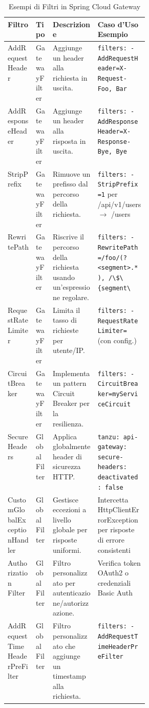 \begin{table}[ht!]
\small
\centering
\caption{Esempi di Filtri in Spring Cloud Gateway}
\renewcommand{\arraystretch}{1.5}
\label{tab:filtri_scg_}
\begin{tabularx}{\linewidth}{%
    >{\RaggedRight\arraybackslash}p{0.2\linewidth} 
    >{\RaggedRight\arraybackslash}p{0.12\linewidth} 
    >{\RaggedRight\arraybackslash}X                 
    >{\RaggedRight\arraybackslash}X                 
}
\toprule
\textbf{Filtro} & \textbf{Tipo} & \textbf{Descrizione} & \textbf{Caso d'Uso Esempio} \\
\midrule
AddRequestHeader & GatewayFilter & Aggiunge un header alla richiesta in uscita. & \lstinline{filters: - AddRequestHeader=X-Request-Foo, Bar} \\
AddResponseHeader & GatewayFilter & Aggiunge un header alla risposta in uscita. & \lstinline{filters: - AddResponseHeader=X-Response-Bye, Bye} \\
StripPrefix & GatewayFilter & Rimuove un prefisso dal percorso della richiesta. & \lstinline{filters: - StripPrefix=1} per /api/v1/users $\rightarrow$ /users \\
RewritePath & GatewayFilter & Riscrive il percorso della richiesta usando un'espressione regolare. & \lstinline{filters: - RewritePath=/foo/(?<segment>.*), /\$\{segment\}} \\
RequestRateLimiter & GatewayFilter & Limita il tasso di richieste per utente/IP. & \lstinline{filters: - RequestRateLimiter=} (con config.) \\
CircuitBreaker & GatewayFilter & Implementa un pattern Circuit Breaker per la resilienza. & \lstinline{filters: - CircuitBreaker=myServiceCircuit} \\
SecureHeaders & GlobalFilter & Applica globalmente header di sicurezza HTTP. & \lstinline{tanzu: api-gateway: secure-headers: deactivated: false} \\
CustomGlobal\-ExceptionHandler & GlobalFilter & Gestisce eccezioni a livello globale per risposte uniformi. & Intercetta HttpClientErrorException per risposte di errore consistenti \\
Authorization Filter & GlobalFilter & Filtro personalizzato per autenticazione/autorizzazione. & Verifica token OAuth2 o credenziali Basic Auth \\
AddRequestTime\-Header\-PreFilter & GlobalFilter & Filtro personalizzato che aggiunge un timestamp alla richiesta. & \lstinline{filters: - AddRequestTimeHeaderPreFilter} \\
\bottomrule
\end{tabularx}
\end{table}

